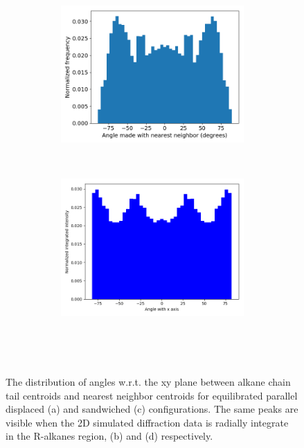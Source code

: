 \documentclass{article}
\begin{document}
\begin{figure}[ht]
	\begin{subfigure}{\linewidth}
	\centering
		\begin{subfigure}{0.45\textwidth}
	        \centering
		        \includegraphics[width=\linewidth]{angles_traj_layered.png}
		        \caption{}~\label{fig:rz_layered}
		\end{subfigure}
		\begin{subfigure}{0.45\textwidth}
        	\centering
		        \includegraphics[width=\linewidth]{layered_angle_v_I.png}
		        \caption{}~\label{fig:test}
		\end{subfigure}
	\end{subfigure}
  \caption{The distribution of angles w.r.t. the xy plane between alkane chain tail centroids and nearest
  neighbor centroids for equilibrated parallel displaced (a) and sandwiched (c) configurations. The
  same peaks are visible when the 2D simulated diffraction data is radially integrate in the R-alkanes region,
  (b) and (d) respectively.}~\label{fig:tail_packing}
  \end{figure}
\end{document}
